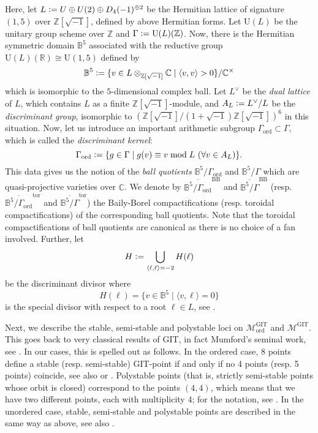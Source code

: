 \documentclass[12pt, pdftex]{amsart}
\theoremstyle{plain}
\theoremstyle{definition}
\numberwithin{equation}{section}
\def\R{{\mathbb R}}
\def\Z{{\mathbb Z}}
\def\C{{\mathbb C}}
\def\B{{\mathbb B}}
\def\ord{\mathrm{ord}}
\def\GIT{\mathrm{GIT}}
\def\tor{\mathrm{tor}}
\def\BB{\mathrm{BB}}
\def\M{\mathcal{M}}
\def\l{\langle}
\def\r{\rangle}
\def\U{\mathrm{U}}
\newcommand{\defeq}{\vcentcolon=}
\begin{document}
Here, let $L\defeq U\oplus U(2)\oplus D_4(-1)^{\oplus 2}$ be the Hermitian lattice of signature $(1,5)$ over $\Z[\sqrt{-1}]$, defined by above Hermitian forms.
Let $\U(L)$ be the unitary group scheme over $\Z$ and $\Gamma\defeq\U(L)(\Z)$.
Now, there is the Hermitian symmetric domain $\B^5$ associated with the reductive group $\U(L)(\R)\cong \U(1,5)$ defined by 
\[\B^5\defeq\{v\in L\otimes_{\Z[\sqrt{-1}]}\C\mid \l v,v\r>0 \}/\C^{\times}\]
which is isomorphic to the $5$-dimensional complex ball.
Let $L^{\vee}$ be the \textit{dual lattice} of $L$, which contains $L$ as a finite $\Z[\sqrt{-1}]$-module, and $A_L\defeq L^{\vee}/L$ be the \textit{discriminant group}, isomorphic to $\left(\Z[\sqrt{-1}]/(1+\sqrt{-1})\Z[\sqrt{-1}]\right)^6$ in this situation. 
Now, let us introduce an important arithmetic subgroup $\Gamma_{\ord}\subset\Gamma$, which is called the \textit{discriminant kernel}:
\[\Gamma_{\ord}\defeq\{g\in\Gamma\mid g(v)\equiv v\bmod L\ (\forall v\in A_L)\}.\]
This data gives us the notion of the \textit{ball quotients} 
$\B^5/\Gamma_{\ord}$ and $\B^5/\Gamma$
which are quasi-projective varieties over $\C$.
We denote by $\overline{\B^5/\Gamma_{\ord}}^{\BB}$ and  $\overline{\B^5/\Gamma}^{\BB}$ (resp. $\overline{\B^5/\Gamma_{\ord}}^{\tor}$ and $\overline{\B^5/\Gamma}^{\tor}$) the Baily-Borel compactifications (resp. toroidal compactifications) of the corresponding ball quotients.
Note that the toroidal compactifications of ball quotients are canonical as there is no choice of a fan involved.
Further, let 
\[H\defeq\bigcup_{\l\ell,\ell\r=-2} H(\ell)\]
be the discriminant divisor where 
\[H(\ell)= \{v\in\B^5\mid\l v,\ell\r=0\}\]
is the special divisor
with respect to a root $\ell\in L$, see \cite[Subsection 3.4]{Ko07a}.

Next, we describe the stable, semi-stable and polystable loci on $\M_{\ord}^{\GIT}$ and $\M^{\GIT}$. This goes back to very classical results of GIT, in fact 
Mumford's seminal work, see  \cite[Chapter 4, \S 2]{MFK94}. 
In our cases, this is spelled out as follows. In the ordered case, 8 points define a stable (resp. semi-stable) GIT-point if and only if no 4 points (resp. 5 points) coincide, see also
\cite[Subsection 4.4]{Ko07a} or \cite[Example 2, p31]{Do88}.
Polystable points (that is, strictly semi-stable points whose orbit is closed) correspond to the points $(4,4)$, which means that we have two different points, each with multiplicity $4$; 
for the notation, see \cite[Subsection 4.4]{Ko07a}.
In the unordered case, stable, semi-stable and polystable points are described in the same way as above, see also \cite[Subsection 7.2 (c)]{Mu03}. 
\end{document}
